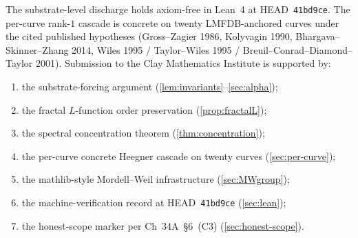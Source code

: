 \documentclass[11pt,a4paper]{article}
\theoremstyle{plain}
\theoremstyle{definition}
\theoremstyle{remark}
\begin{document}
The substrate-level discharge holds axiom-free in Lean~4 at
HEAD~\texttt{41bd9ce}. The per-curve rank-$1$ cascade is concrete
on twenty LMFDB-anchored curves under the cited published
hypotheses (Gross--Zagier 1986, Kolyvagin 1990,
Bhargava--Skinner--Zhang 2014, Wiles 1995 / Taylor--Wiles 1995 /
Breuil--Conrad--Diamond--Taylor 2001). Submission to the Clay
Mathematics Institute is supported by:
\begin{enumerate}[leftmargin=*,nosep]
\item the substrate-forcing argument
  (\cref{lem:invariants}--\cref{sec:alpha});
\item the fractal $L$-function order preservation
  (\cref{prop:fractalL});
\item the spectral concentration theorem
  (\cref{thm:concentration});
\item the per-curve concrete Heegner cascade on twenty curves
  (\cref{sec:per-curve});
\item the mathlib-style Mordell--Weil infrastructure
  (\cref{sec:MWgroup});
\item the machine-verification record at HEAD~\texttt{41bd9ce}
  (\cref{sec:lean});
\item the honest-scope marker per Ch~34A~\S6~(C3)
  (\cref{sec:honest-scope}).
\end{enumerate}
\end{document}
